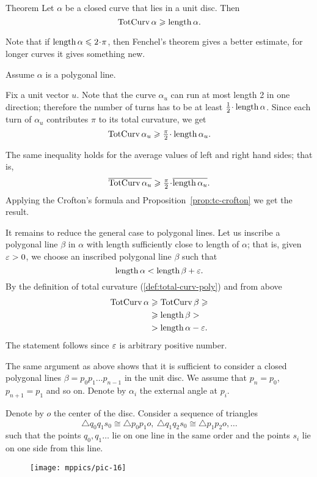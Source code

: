 \begin{thm}{Theorem}
Let $\alpha$ be a closed curve that lies in a unit disc.
Then 
\[\mathop{\rm TotCurv}\nolimits\alpha\geqslant \mathop{\rm length}\nolimits\alpha.\]
\end{thm}

Note that if $\length\alpha\le2\cdot\pi$, then Fenchel's theorem gives a better estimate,
for longer curves it gives something new.

Assume $\alpha$ is a polygonal line.

Fix a unit vector $u$.
Note that the curve $\alpha_u$ can run at most length 2 in one direction;
therefore the number of turns has to be at least $\tfrac12\cdot\length\alpha$.
Since each turn of $\alpha_u$ contributes $\pi$ to its total curvature, we get
\[\tc\alpha_u\ge \tfrac\pi2\cdot\length\alpha_u.\]

The same inequality holds for the average values of left and right hand sides;
that is,
\[\overline{\tc\alpha_u}
\ge \tfrac\pi2\cdot\overline{\length\alpha_u}.\]
Applying the Crofton's formula and Proposition~\ref{prop:tc-crofton} we get the result.

It remains to reduce the general case to polygonal lines.
Let us inscribe a polygonal line $\beta$ in $\alpha$ with length sufficiently close to length of $\alpha$;
that is, given $\varepsilon>0$, we choose an inscribed polygonal line $\beta$ such that 
\[\mathop{\rm length}\nolimits \alpha<\mathop{\rm length}\nolimits \beta+\varepsilon.\]
By the definition of total curvature (\ref{def:total-curv-poly}) and from above
\begin{align*}
\mathop{\rm TotCurv}\nolimits\alpha&\geqslant\mathop{\rm TotCurv}\nolimits\beta\geqslant
\\
&\geqslant \mathop{\rm length}\nolimits\beta>
\\
&>\mathop{\rm length}\nolimits\alpha-\varepsilon.
\end{align*}
The statement follows since $\varepsilon$ is arbitrary positive number. 
\qeds

The same argument as above shows that it is sufficient to consider a closed polygonal lines $\beta=p_0p_1\dots p_{n-1}$ in the unit disc.
We assume that $p_n=p_0$, $p_{n+1}=p_1$ and so on.
Denote by $\alpha_i$ the external angle at $p_i$.

Denote by $o$ the center of the disc.
Consider a sequence of triangles 
\[\triangle q_0q_1s_0\cong \triangle p_0p_1o,\ \triangle q_1q_2s_0\cong \triangle p_1p_2o,\dots\]
such that the points $q_0,q_1\dots$ lie on one line in the same order and the points $s_i$ lie on one side from this line.

\begin{figure}[h]
\vskip-0mm
\centering
\texttt{[image: mppics/pic-16]}
\vskip0mm
\end{figure}

